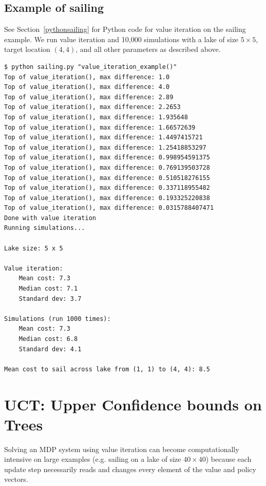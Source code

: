 \documentclass[12pt,amstags,fleqn]{article}
\theoremstyle{plain}
\theoremstyle{definition}
\theoremstyle{definition}
\begin{document}
\subsection{Example of sailing}

See Section~\ref{pythonsailing} for Python code for value iteration
on the sailing example. We run value iteration and 10,000 simulations
with a lake of size $5 \times 5$, target location $(4,4)$, and all
other parameters as described above.

\begin{Verbatim}
$ python sailing.py "value_iteration_example()"
Top of value_iteration(), max difference: 1.0
Top of value_iteration(), max difference: 4.0
Top of value_iteration(), max difference: 2.89
Top of value_iteration(), max difference: 2.2653
Top of value_iteration(), max difference: 1.935648
Top of value_iteration(), max difference: 1.66572639
Top of value_iteration(), max difference: 1.4497415721
Top of value_iteration(), max difference: 1.25418853297
Top of value_iteration(), max difference: 0.998954591375
Top of value_iteration(), max difference: 0.769139503728
Top of value_iteration(), max difference: 0.510518276155
Top of value_iteration(), max difference: 0.337118955482
Top of value_iteration(), max difference: 0.193325220838
Top of value_iteration(), max difference: 0.0315788407471
Done with value iteration
Running simulations...

Lake size: 5 x 5

Value iteration:
    Mean cost: 7.3
    Median cost: 7.1
    Standard dev: 3.7

Simulations (run 1000 times):
    Mean cost: 7.3
    Median cost: 6.8
    Standard dev: 4.1

Mean cost to sail across lake from (1, 1) to (4, 4): 8.5
\end{Verbatim}

\section{UCT: Upper Confidence bounds on Trees}\label{uctsec}

Solving an MDP system using value iteration can become computationally
intensive on large examples (e.g. sailing on a lake of size $40 \times
40$) because each update step necessarily reads and changes every
element of the value and policy vectors.
\end{document}
